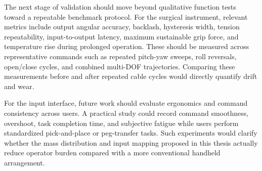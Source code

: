 The next stage of validation should move beyond qualitative function tests toward a repeatable benchmark protocol. For the surgical instrument, relevant metrics include output angular accuracy, backlash, hysteresis width, tension repeatability, input-to-output latency, maximum sustainable grip force, and temperature rise during prolonged operation. These should be measured across representative commands such as repeated pitch-yaw sweeps, roll reversals, open/close cycles, and combined multi-DOF trajectories. Comparing these measurements before and after repeated cable cycles would directly quantify drift and wear.

For the input interface, future work should evaluate ergonomics and command consistency across users. A practical study could record command smoothness, overshoot, task completion time, and subjective fatigue while users perform standardized pick-and-place or peg-transfer tasks. Such experiments would clarify whether the mass distribution and input mapping proposed in this thesis actually reduce operator burden compared with a more conventional handheld arrangement.
